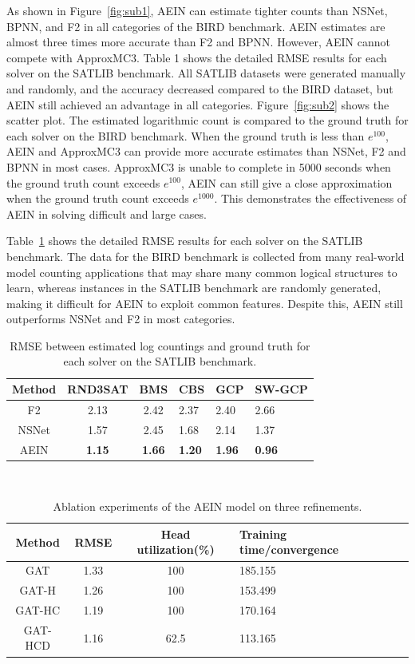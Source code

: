 As shown in Figure~\ref{fig:sub1}, AEIN can estimate tighter counts than NSNet, BPNN, and F2 in all 
categories of the BIRD benchmark. AEIN estimates are almost three times more accurate than F2 and BPNN. 
However, AEIN cannot compete with ApproxMC3.
Table 1 shows the detailed RMSE results for each solver on the SATLIB benchmark. All SATLIB datasets 
were generated manually and randomly, and the accuracy decreased compared to the BIRD dataset, but AEIN 
still achieved an advantage in all categories.
Figure~\ref{fig:sub2} shows the scatter plot. The estimated logarithmic count is compared to the ground 
truth for each solver on the BIRD benchmark. When the ground truth is less than \(e^{100}\), AEIN and 
ApproxMC3 can provide more accurate estimates than NSNet, F2 and BPNN in most cases. ApproxMC3 is unable 
to complete in 5000 seconds when the ground truth count exceeds \(e^{100}\), AEIN can still give a close 
approximation when the ground truth count exceeds \(e^{1000}\). This demonstrates the effectiveness of AEIN 
in solving difficult and large cases.

Table~\ref{tab1} shows the detailed RMSE results for each solver on the SATLIB benchmark. The data for 
the BIRD benchmark is collected from many real-world model counting applications that may share many 
common logical structures to learn, whereas instances in the SATLIB benchmark are randomly generated, 
making it difficult for AEIN to exploit common features. Despite this, AEIN still outperforms NSNet and 
F2 in most categories.

\begin{table}[htbp] 
  \centering  
  \caption{RMSE between estimated log countings and ground truth for each solver on the SATLIB benchmark.}  
  \begin{tabular}{ccclll}  
    \toprule
    Method& RND3SAT& BMS & CBS& GCP&SW-GCP\\  
    \midrule
    F2& 2.13& 2.42& 2.37& 2.40&2.66\\  
    NSNet& 1.57& 2.45& 1.68& 2.14&1.37\\  
    AEIN& \textbf{1.15}& \textbf{1.66}& \textbf{1.20}& \textbf{1.96}&\textbf{0.96}\\  
    \bottomrule
  \end{tabular}
  \label{tab1}  
\end{table}\\

\begin{table}[htbp] 
  \centering  
  \caption{Ablation experiments of the AEIN model on three refinements.}  
  \begin{tabular}{ccclll}  
    \toprule
    Method& RMSE& Head utilization(\%)& Training time/convergence\\ 
    \midrule
    GAT& 1.33& 100& 185.155\\  
    GAT-H& 1.26& 100& 153.499\\  
    GAT-HC& 1.19& 100& 170.164\\
    \centering  
    GAT-HCD& 1.16& 62.5& 113.165\\  
    \bottomrule
  \end{tabular}
  \label{tab2}  
\end{table}\\


